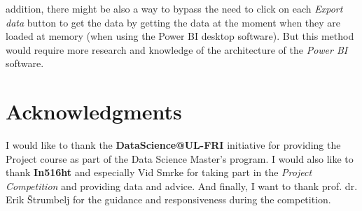 \documentclass[fleqn,moreauthors,10pt]{ds_report}
\begin{document}
\In addition, there might be also a way to bypass the need to click on each \textit{Export data} button to get the data by getting the data at the moment when they are loaded at memory (when using the Power BI desktop software). But this method would require more research and knowledge of the architecture of the \textit{Power BI} software.



\section*{Acknowledgments}

I would like to thank the \textbf{DataScience@UL-FRI} initiative for providing the Project course as part of the Data Science Master's program. I would also like to thank  \textbf{In516ht} and especially Vid Smrke for taking part in the \textit{Project Competition} and providing data and advice.  And finally, I want to thank prof. dr. Erik \v{S}trumbelj for the guidance and responsiveness during the competition.





\end{document}
